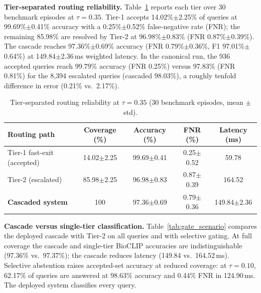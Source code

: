 \documentclass[preprint,12pt]{elsarticle}
\begin{document}
\textbf{Tier-separated routing reliability.} Table~\ref{tab:tier_routing} reports each tier over 30 benchmark episodes at $\tau=0.35$. Tier-1 accepts 14.02\%$\pm$2.25\% of queries at 99.69\%$\pm$0.41\% accuracy with a 0.25\%$\pm$0.52\% false-negative rate (FNR); the remaining 85.98\% are resolved by Tier-2 at 96.98\%$\pm$0.83\% (FNR 0.87\%$\pm$0.39\%). The cascade reaches 97.36\%$\pm$0.69\% accuracy (FNR 0.79\%$\pm$0.36\%, F1 97.01\%$\pm$0.64\%) at 149.84$\pm$2.36\,ms weighted latency. In the canonical run, the 936 accepted queries reach 99.79\% accuracy (FNR 0.25\%) versus 97.83\% (FNR 0.81\%) for the 8,394 escalated queries (cascaded 98.03\%), a roughly tenfold difference in error (0.21\% vs.\ 2.17\%).

\begin{table}[htbp]
\caption{Tier-separated routing reliability at $\tau=0.35$ (30 benchmark episodes, mean $\pm$ std).}
\label{tab:tier_routing}
\centering

\footnotesize
\begin{tabularx}{\textwidth}{Xcccc}
\toprule
\textbf{Routing path} & \textbf{Coverage (\%)} & \textbf{Accuracy (\%)} & \textbf{FNR (\%)} & \textbf{Latency (ms)} \\
\midrule
Tier-1 fast-exit (accepted) & 14.02$\pm$2.25 & 99.69$\pm$0.41 & 0.25$\pm$0.52 & 59.78 \\
Tier-2 (escalated) & 85.98$\pm$2.25 & 96.98$\pm$0.83 & 0.87$\pm$0.39 & 164.52 \\
\midrule
\textbf{Cascaded system} & 100 & 97.36$\pm$0.69 & 0.79$\pm$0.36 & 149.84$\pm$2.36 \\
\bottomrule
\end{tabularx}
\end{table}

\textbf{Cascade versus single-tier classification.} Table~\ref{tab:gate_scenario} compares the deployed cascade with Tier-2 on all queries and with selective gating. At full coverage the cascade and single-tier BioCLIP accuracies are indistinguishable (97.36\% vs.\ 97.37\%); the cascade reduces latency (149.84 vs.\ 164.52\,ms). Selective abstention raises accepted-set accuracy at reduced coverage: at $\tau=0.10$, 62.17\% of queries are answered at 98.63\% accuracy and 0.44\% FNR in 124.90\,ms. The deployed system classifies every query.
\end{document}
